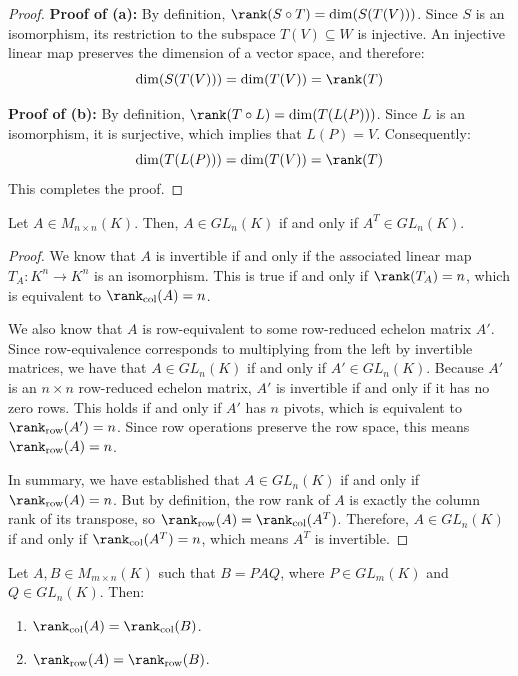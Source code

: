\begin{proof}
\textbf{Proof of (a):} By definition, $\rank(S \circ T) = \dim (S(T(V)))$. Since $S$ is an isomorphism, its restriction to the subspace $T(V) \subseteq W$ is injective. An injective linear map preserves the dimension of a vector space, and therefore:
\begin{equation*}
    \dim (S(T(V))) = \dim (T(V)) = \rank(T)
\end{equation*}

\textbf{Proof of (b):} By definition, $\rank(T \circ L) = \dim (T(L(P)))$. Since $L$ is an isomorphism, it is surjective, which implies that $L(P) = V$. Consequently:
\begin{equation*}
    \dim (T(L(P))) = \dim (T(V)) = \rank(T)
\end{equation*}
This completes the proof.
\end{proof}

\begin{lemma} \label{lemma:17.c.3}
Let $A \in M_{n \times n}(K)$. Then, $A \in GL_n(K)$ if and only if $A^T \in GL_n(K)$.
\end{lemma}

\begin{proof}
We know that $A$ is invertible if and only if the associated linear map $T_A: K^n \to K^n$ is an isomorphism. This is true if and only if $\rank(T_A) = n$, which is equivalent to $\rank_{\text{col}}(A) = n$.

We also know that $A$ is row-equivalent to some row-reduced echelon matrix $A'$. Since row-equivalence corresponds to multiplying from the left by invertible matrices, we have that $A \in GL_n(K)$ if and only if $A' \in GL_n(K)$. Because $A'$ is an $n \times n$ row-reduced echelon matrix, $A'$ is invertible if and only if it has no zero rows. This holds if and only if $A'$ has $n$ pivots, which is equivalent to $\rank_{\text{row}}(A') = n$. Since row operations preserve the row space, this means $\rank_{\text{row}}(A) = n$.

In summary, we have established that $A \in GL_n(K)$ if and only if $\rank_{\text{row}}(A) = n$. But by definition, the row rank of $A$ is exactly the column rank of its transpose, so $\rank_{\text{row}}(A) = \rank_{\text{col}}(A^T)$. Therefore, $A \in GL_n(K)$ if and only if $\rank_{\text{col}}(A^T) = n$, which means $A^T$ is invertible.
\end{proof}

\begin{lemma} \label{lemma:17.c.4}
Let $A, B \in M_{m \times n}(K)$ such that $B = P A Q$, where $P \in GL_m(K)$ and $Q \in GL_n(K)$. Then:
\begin{enumerate}
    \item $\rank_{\text{col}}(A) = \rank_{\text{col}}(B)$.
    \item $\rank_{\text{row}}(A) = \rank_{\text{row}}(B)$.
\end{enumerate}
\end{lemma}

